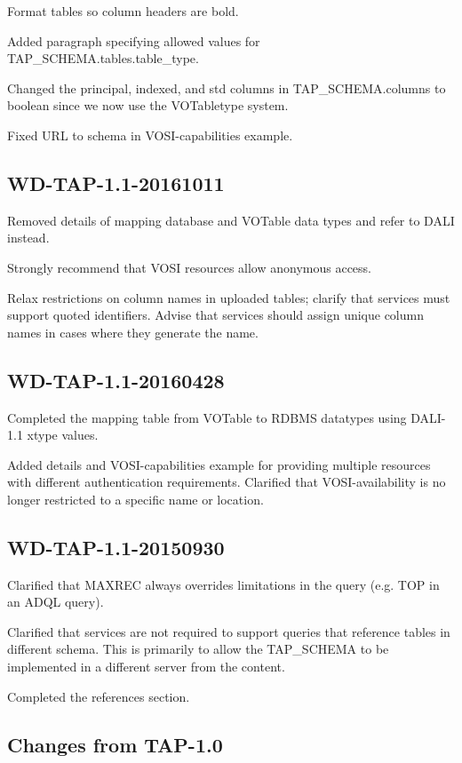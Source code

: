 \documentclass[11pt,letter]{ivoa}
\begin{document}
Format tables so column headers are bold.

Added paragraph specifying allowed values for TAP\_SCHEMA.tables.table\_type.

Changed the principal, indexed, and std columns in TAP\_SCHEMA.columns to boolean since we
now use the VOTabletype system.

Fixed URL to schema in VOSI-capabilities example.

\subsection{WD-TAP-1.1-20161011}

Removed details of mapping database and VOTable data types and refer to DALI 
instead. 

Strongly recommend that VOSI resources allow anonymous access.

Relax restrictions on column names in uploaded tables; clarify that services 
must support quoted identifiers. Advise that services should assign unique 
column names in cases where they generate the name.

\subsection{WD-TAP-1.1-20160428}

Completed the mapping table from VOTable to RDBMS datatypes using DALI-1.1 xtype values.

Added details and VOSI-capabilities example for providing multiple resources with different 
authentication requirements. Clarified that VOSI-availability is no longer restricted to a
specific name or location.

\subsection{WD-TAP-1.1-20150930}

Clarified that MAXREC always overrides limitations in the query (e.g. 
TOP in an ADQL query).

Clarified that services are not required to support queries that reference tables 
in different schema. This is primarily to allow the TAP\_SCHEMA to be implemented 
in a different server from the content.

Completed the references section.

\subsection{Changes from TAP-1.0}
\end{document}
